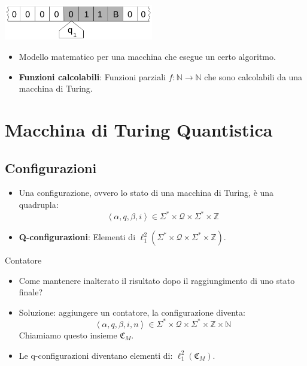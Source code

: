 \documentclass{beamer}
\begin{document}
\begin{frame}{\subsecname}{}
	\centering\includegraphics[width=6.5cm]{Turing_machine_2b.png}
	\begin{itemize}
		\item Modello matematico per una macchina che esegue un certo algoritmo.
		\item \textbf{Funzioni calcolabili}: Funzioni parziali \( f : \mathbb{N} \rightarrow \mathbb{N} \) che sono calcolabili da una macchina di Turing.
	\end{itemize}
\end{frame}

\section{Macchina di Turing Quantistica}

\subsection{Configurazioni}

\begin{frame}{\subsecname}{}
	\begin{itemize}
		\item Una configurazione, ovvero lo stato di una macchina di Turing, è una quadrupla:
		\[ \left \langle \alpha, q, \beta, i \right \rangle \in \Sigma^{*} \times \mathcal{Q} \times \Sigma^{*} \times \mathbb{Z} \]
		\item \textbf{Q-configurazioni}: Elementi di \( \ell^{2}_{1} \left ( \Sigma^{*} \times \mathcal{Q} \times \Sigma^{*} \times \mathbb{Z} \right ) \).
	\end{itemize}
\end{frame}

\begin{frame}{\subsecname}{Contatore}
	\begin{itemize}
		\item Come mantenere inalterato il risultato dopo il raggiungimento di uno stato finale?
		\item Soluzione: aggiungere un contatore, la configurazione diventa:
		\[ \left \langle \alpha, q, \beta, i, n \right \rangle \in \Sigma^{*} \times \mathcal{Q} \times \Sigma^{*} \times \mathbb{Z} \times \mathbb{N} \]
		Chiamiamo questo insieme \(\mathfrak{C}_M\).
		\item Le q-configurazioni diventano elementi di: \( \ell^{2}_{1} \left ( \mathfrak{C}_M \right ) \).
	\end{itemize}
\end{frame}
\end{document}
